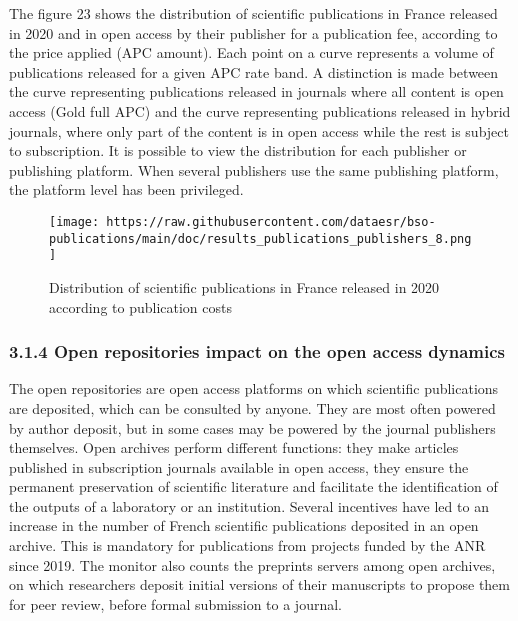 \documentclass[
]{article}
\begin{document}
The figure 23 shows the distribution of scientific publications in
France released in 2020 and in open access by their publisher for a
publication fee, according to the price applied (APC amount). Each point
on a curve represents a volume of publications released for a given APC
rate band. A distinction is made between the curve representing
publications released in journals where all content is open access (Gold
full APC) and the curve representing publications released in hybrid
journals, where only part of the content is in open access while the
rest is subject to subscription. It is possible to view the distribution
for each publisher or publishing platform. When several publishers use
the same publishing platform, the platform level has been privileged.

\begin{figure}
\centering
\texttt{[image: https://raw.githubusercontent.com/dataesr/bso-publications/main/doc/results\_publications\_publishers\_8.png]}
\caption{Distribution of scientific publications in France released in
2020 according to publication costs}
\end{figure}

\hypertarget{open-repositories-impact-on-the-open-access-dynamics}{%
\subsubsection{3.1.4 Open repositories impact on the open access
dynamics}\label{open-repositories-impact-on-the-open-access-dynamics}}

The open repositories are open access platforms on which scientific
publications are deposited, which can be consulted by anyone. They are
most often powered by author deposit, but in some cases may be powered
by the journal publishers themselves. Open archives perform different
functions: they make articles published in subscription journals
available in open access, they ensure the permanent preservation of
scientific literature and facilitate the identification of the outputs
of a laboratory or an institution. Several incentives have led to an
increase in the number of French scientific publications deposited in an
open archive. This is mandatory for publications from projects funded by
the ANR since 2019. The monitor also counts the preprints servers among
open archives, on which researchers deposit initial versions of their
manuscripts to propose them for peer review, before formal submission to
a journal.
\end{document}

